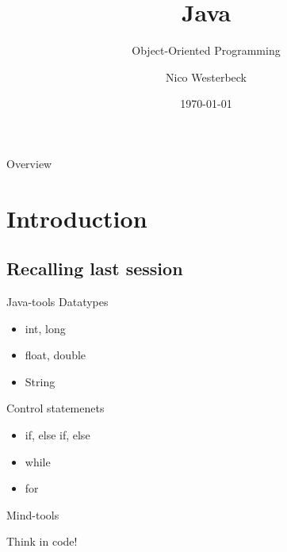 

\title{Java}
\subtitle{Object-Oriented Programming}
\author{Nico Westerbeck}
\date{\today}

\def\tikzoverlay{%
   \tikz[baseline,overlay]\node[every overlay node]
}%




\begin{frame}
\titlepage
\end{frame}
\begin{frame}{Overview}
\tableofcontents
\end{frame}

\section{Introduction}
\subsection{Recalling last session}
\begin{frame}{Java-tools}
	Datatypes
	\begin{itemize}
		\item int, long
		\item float, double
		\item String
	\end{itemize}
	Control statemenets
	\begin{itemize}
		\item if, else if, else
		\item while
		\item for
	\end{itemize}
\end{frame}

\begin{frame}{Mind-tools}
	\begin{center}
		{\huge Think in code!}
		
	\end{center}
\end{frame}

